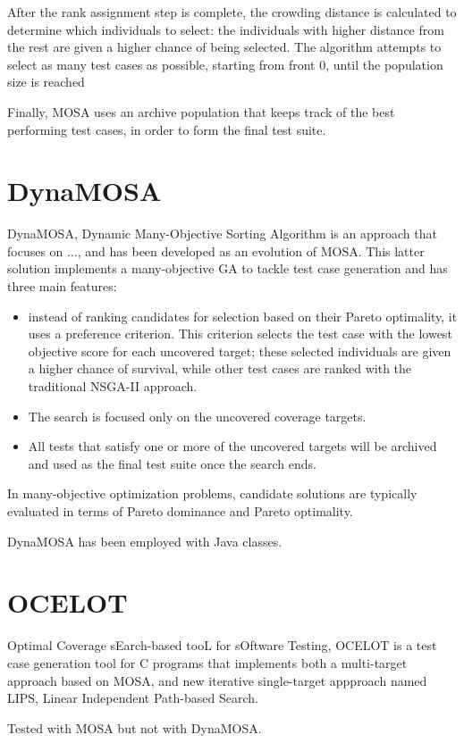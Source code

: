 After the rank assignment step is complete, the crowding distance is calculated to determine which individuals to select: the individuals with higher distance from the rest are given a higher chance of being selected. The algorithm attempts to select as many test cases as possible, starting from front 0,  until the population size is reached

Finally, MOSA uses an archive population that keeps track of the best performing test cases, in order to form the final test suite.


\section{DynaMOSA}
DynaMOSA, Dynamic Many-Objective Sorting Algorithm \cite{DBLP:journals/tse/PanichellaKT18} is an approach that focuses on ..., and has been developed as an evolution of MOSA. This latter solution implements a many-objective GA to tackle test case generation and has three main features: 
\begin{itemize}
    \item instead of ranking candidates for selection based on their Pareto optimality, it uses a preference criterion. This criterion selects the test case with the lowest objective score for each uncovered target; these selected individuals are given a higher chance of survival, while other test cases are ranked with the traditional NSGA-II approach.
    \item The search is focused only on the uncovered coverage targets.
    \item All tests that satisfy one or more of the uncovered targets will be archived and used as the final test suite once the search ends.
\end{itemize}

In many-objective optimization problems, candidate solutions are typically evaluated in terms of Pareto dominance and Pareto optimality.

DynaMOSA has been employed with Java classes.





\section{OCELOT}
Optimal Coverage sEarch-based tooL for sOftware Testing, OCELOT \cite{DBLP:conf/ssbse/ScalabrinoGNOL16} is a test case generation tool for C programs that implements both a multi-target approach based on MOSA, and new iterative single-target appproach named LIPS, Linear Independent Path-based Search.

Tested with MOSA but not with DynaMOSA.